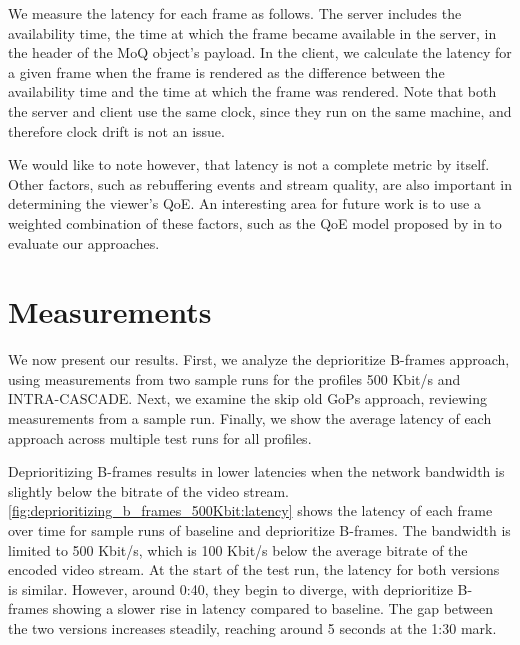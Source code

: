 We measure the latency for each frame as follows. The server includes the availability time, the time at which the frame became available in the server, in the header of the MoQ object's payload. In the client, we calculate the latency for a given frame when the frame is rendered as the difference between the availability time and the time at which the frame was rendered. Note that both the server and client use the same clock, since they run on the same machine, and therefore clock drift is not an issue.

We would like to note however, that latency is not a complete metric by itself. Other factors, such as rebuffering events and stream quality, are also important in determining the viewer's \ac{QoE}. An interesting area for future work is to use a weighted combination of these factors, such as the \ac{QoE} model proposed by \citeauthor{yinControlTheoreticApproachDynamic2015} in \parencite{yinControlTheoreticApproachDynamic2015} to evaluate our approaches.

\section{Measurements}
We now present our results. First, we analyze the deprioritize B-frames approach, using measurements from two sample runs for the profiles 500 Kbit/s and INTRA-CASCADE. Next, we examine the skip old GoPs approach, reviewing measurements from a sample run. Finally, we show the average latency of each approach across multiple test runs for all profiles.

Deprioritizing B-frames results in lower latencies when the network bandwidth is slightly below the bitrate of the video stream. \autoref{fig:deprioritizing_b_frames_500Kbit:latency} shows the latency of each frame over time for sample runs of baseline and deprioritize B-frames. The bandwidth is limited to 500 Kbit/s, which is 100 Kbit/s below the average bitrate of the encoded video stream. At the start of the test run, the latency for both versions is similar. However, around 0:40, they begin to diverge, with deprioritize B-frames showing a slower rise in latency compared to baseline. The gap between the two versions increases steadily, reaching around 5 seconds at the 1:30 mark.

